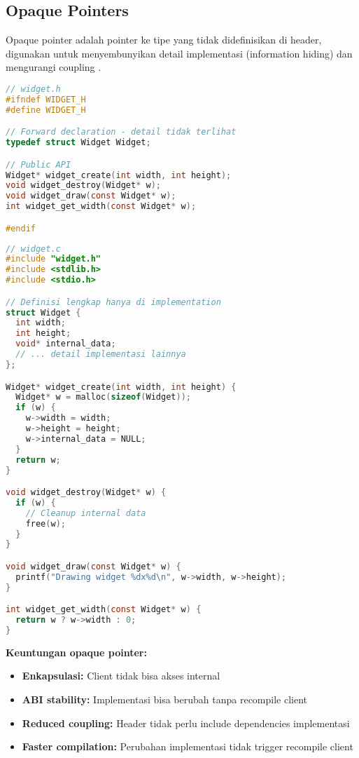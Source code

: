 \documentclass[../main.tex]{subfiles}
\begin{document}
\subsection{Opaque Pointers}
Opaque pointer adalah pointer ke tipe yang tidak didefinisikan di header, digunakan untuk menyembunyikan detail implementasi (information hiding) dan mengurangi coupling \parencite{gnu-c-manual}.

\begin{lstlisting}[language=C, caption={Opaque pointer pattern --- Header}]
// widget.h
#ifndef WIDGET_H
#define WIDGET_H

// Forward declaration - detail tidak terlihat
typedef struct Widget Widget;

// Public API
Widget* widget_create(int width, int height);
void widget_destroy(Widget* w);
void widget_draw(const Widget* w);
int widget_get_width(const Widget* w);

#endif
\end{lstlisting}

\begin{lstlisting}[language=C, caption={Opaque pointer pattern --- Implementation}]
// widget.c
#include "widget.h"
#include <stdlib.h>
#include <stdio.h>

// Definisi lengkap hanya di implementation
struct Widget {
  int width;
  int height;
  void* internal_data;
  // ... detail implementasi lainnya
};

Widget* widget_create(int width, int height) {
  Widget* w = malloc(sizeof(Widget));
  if (w) {
    w->width = width;
    w->height = height;
    w->internal_data = NULL;
  }
  return w;
}

void widget_destroy(Widget* w) {
  if (w) {
    // Cleanup internal data
    free(w);
  }
}

void widget_draw(const Widget* w) {
  printf("Drawing widget %dx%d\n", w->width, w->height);
}

int widget_get_width(const Widget* w) {
  return w ? w->width : 0;
}
\end{lstlisting}

\textbf{Keuntungan opaque pointer:}
\begin{itemize}
  \item \textbf{Enkapsulasi:} Client tidak bisa akses internal
  \item \textbf{ABI stability:} Implementasi bisa berubah tanpa recompile client
  \item \textbf{Reduced coupling:} Header tidak perlu include dependencies implementasi
  \item \textbf{Faster compilation:} Perubahan implementasi tidak trigger recompile client
\end{itemize}
\end{document}
